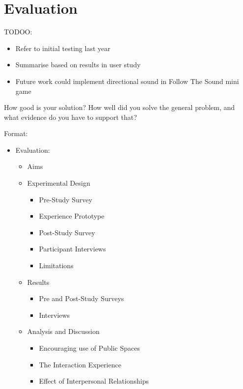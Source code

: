 \documentclass{l4proj}
\begin{document}




\chapter{Evaluation} 

TODOO:
\begin{itemize}
    \item Refer to initial testing last year
    \item Summarise based on results in user study
    \item Future work could implement directional sound in Follow The Sound mini game
\end{itemize}

How good is your solution? How well did you solve the general problem, and what evidence do you have to support that?

Format:
\begin{itemize}
    \item Evaluation:
    \begin{itemize}
        \item Aims
        \item Experimental Design
        \begin{itemize}
            \item Pre-Study Survey
            \item Experience Prototype
            \item Post-Study Survey
            \item Participant Interviews
            \item Limitations
        \end{itemize}
        \item Results
        \begin{itemize}
            \item Pre and Post-Study Surveys
            \item Interviews
        \end{itemize}
        \item Analysis and Discussion
        \begin{itemize}
            \item Encouraging use of Public Spaces
            \item The Interaction Experience
            \item Effect of Interpersonal Relationships
        \end{itemize}
    \end{itemize}
\end{itemize}
\end{document}
